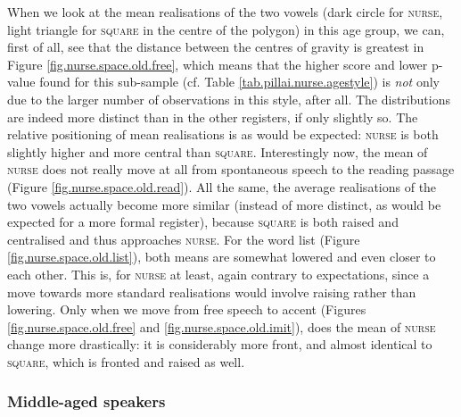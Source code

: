 When we look at the mean realisations of the two vowels (dark circle for \textsc{nurse}, light triangle for \textsc{square} in the centre of the polygon) in this age group, we can, first of all, see that the distance between the centres of gravity is greatest in Figure \ref{fig.nurse.space.old.free}, which means that the higher  score and lower p-value found for this sub-sample (cf. Table \ref{tab.pillai.nurse.agestyle}) is \emph{not} only due to the larger number of observations in this style, after all.
The distributions are indeed more distinct than in the other registers, if only slightly so.
The relative positioning of mean  realisations is as would be expected: \textsc{nurse} is both slightly higher and more central than \textsc{square}.
Interestingly now, the mean of \textsc{nurse} does not really move at all from spontaneous speech to the reading passage (Figure \ref{fig.nurse.space.old.read}).
All the same, the average realisations of the two vowels actually become more similar (instead of more distinct, as would be expected for a more formal register), because \textsc{square} is both raised and centralised and thus approaches \textsc{nurse}.
For the word list (Figure \ref{fig.nurse.space.old.list}), both means are somewhat lowered and even closer to each other.
This is, for \textsc{nurse} at least, again contrary to expectations, since a move towards more standard realisations would involve raising rather than lowering.
Only when we move from free speech to accent  (Figures \ref{fig.nurse.space.old.free} and \ref{fig.nurse.space.old.imit}), does the mean of \textsc{nurse} change more drastically: it is considerably more front, and almost identical to \textsc{square}, which is fronted and raised as well.

\subsubsection{Middle-aged speakers}

